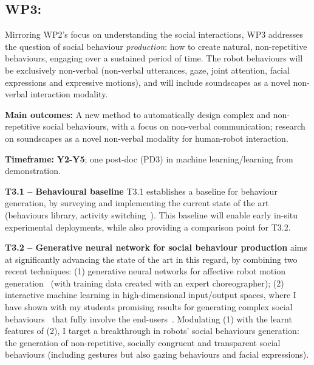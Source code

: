 \subsection{WP3: \textbf{\wpThree}} 

Mirroring WP2's focus on understanding the social interactions, WP3 addresses the
question of social behaviour \emph{production}: how to create natural,
non-repetitive behaviours, engaging over a sustained period of time. The robot
behaviours will be exclusively non-verbal (non-verbal utterances, gaze, joint
attention, facial expressions and expressive motions), and will include
soundscapes as a novel non-verbal interaction modality.

\begin{framed}

    \textbf{Main outcomes:} A new method to automatically design complex and
    non-repetitive social behaviours, with a focus on non-verbal communication;
    research on soundscapes as a novel non-verbal modality for human-robot
    interaction.

    \textbf{Timeframe:} \textbf{Y2-Y5}; one post-doc (PD3) in machine learning/learning from
demonstration.

\end{framed}

\textbf{T3.1 -- Behavioural baseline} T3.1 establishes a baseline for behaviour
generation, by surveying and implementing the current state of the art
(behaviours library, activity switching~\cite{coninx2016towards}). This
baseline will enable early in-situ experimental deployments, while also
providing a comparison point for T3.2.

\textbf{T3.2 -- Generative neural network for social behaviour production}
\project aims at significantly advancing the state of the art in this regard, by
combining two recent techniques: (1) generative neural networks for affective
robot motion generation~\cite{marmpena2019generating,suguitan2020moveae} (with
training data created with an expert choreographer); (2) interactive machine
learning in high-dimensional input/output spaces, where I have shown with my
students promising results for generating complex social
behaviours~\cite{senft2019teaching, winkle2020couch} that fully involve the
end-users~\cite{winkle2018social}. Modulating (1) with the learnt features of
(2), I target a breakthrough in robots' social behaviours generation: the
generation of non-repetitive, socially congruent and transparent social
behaviours (including gestures but also gazing behaviours and facial
expressions).

